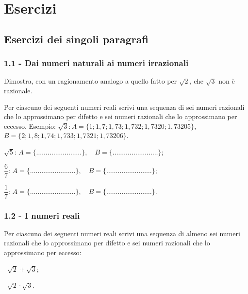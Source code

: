 \section{Esercizi}
\subsection{Esercizi dei singoli paragrafi}
\subsubsection*{1.1 - Dai numeri naturali ai numeri irrazionali}

\begin{esercizio}
\label{ese:1.1}
Dimostra, con un ragionamento analogo a quello fatto per $\sqrt 2$, che $\sqrt 3$ non è razionale.
\end{esercizio}

\begin{esercizio}
\label{ese:1.2}
 Per ciascuno dei seguenti numeri reali scrivi una sequenza di sei numeri razionali che lo approssimano per difetto e sei numeri razionali che lo approssimano per eccesso. Esempio:
$\sqrt 3$:\,$A=\{1; 1,7; 1,73; 1,732; 1,7320; 1,73205\},$\,$B=\{2; 1,8; 1,74; 1,733; 1,7321; 1,73206\}$.
\begin{enumeratea}
 \item$\sqrt{5}:\, A=\{\ldots\ldots\ldots\ldots\ldots\ldots\ldots\ldots\},\quad B=\{\ldots\ldots\ldots\ldots\ldots\ldots\ldots\ldots\}$;
 \item$\dfrac{6}{7}:\, A=\{\ldots\ldots\ldots\ldots\ldots\ldots\ldots\ldots\},\quad B=\{\ldots\ldots\ldots\ldots\ldots\ldots\ldots\ldots\}$;
 \item$\dfrac{1}{7}:\, A=\{\ldots\ldots\ldots\ldots\ldots\ldots\ldots\ldots\},\quad B=\{\ldots\ldots\ldots\ldots\ldots\ldots\ldots\ldots\}$.
\end{enumeratea}
\end{esercizio}

\subsubsection*{1.2 - I numeri reali}

\begin{esercizio}
\label{ese:1.3}
 Per ciascuno dei seguenti numeri reali scrivi una sequenza di almeno sei numeri razionali che lo approssimano per difetto e sei numeri razionali che lo approssimano per eccesso:
\begin{multicols}{2}
\begin{enumeratea}
 \item~$\sqrt {2}+\sqrt {3}$;
 \item~$\sqrt {2}\cdot\sqrt {3}$.
\end{enumeratea}
\end{multicols}
\end{esercizio}


